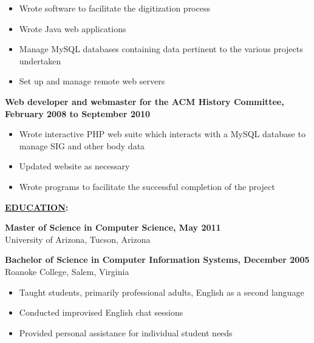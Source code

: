 \documentclass[10pt]{res}
\begin{document}
\begin{resume}
\begin{itemize}
\setlength{\itemsep}{1pt}
\setlength{\parskip}{0pt}
\setlength{\parsep}{0pt}
\item Wrote software to facilitate the digitization process
\item Wrote Java web applications
\item Manage MySQL databases containing data pertinent to the various projects undertaken
\item Set up and manage remote web servers
\end{itemize}

\begin{flushleft}
{\bf Web developer and webmaster for the ACM History Committee, February 2008 to September 2010}
\end{flushleft}

\begin{itemize}
\setlength{\itemsep}{1pt}
\setlength{\parskip}{0pt}
\setlength{\parsep}{0pt}
\item Wrote interactive PHP web suite which interacts with a MySQL database to manage SIG and other body data
\item Updated website as necessary
\item Wrote programs to facilitate the successful completion of the project
\end{itemize}

\begin{flushleft}
{\bf \underline{EDUCATION}:}
\end{flushleft}
{\bf Master of Science in Computer Science, May 2011}\\
University of Arizona, Tucson, Arizona

\begin{flushleft}
{\bf Bachelor of Science in Computer Information Systems, December 2005}\\
Roanoke College, Salem, Virginia
\end{flushleft}


\begin{itemize}
\setlength{\itemsep}{1pt}
\setlength{\parskip}{0pt}
\setlength{\parsep}{0pt}
\item Taught students, primarily professional adults, English as a second language
\item Conducted improvised English chat sessions
\item Provided personal assistance for individual student needs
\end{itemize}


\end{resume}
\end{document}
